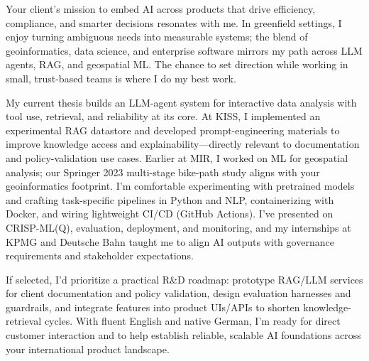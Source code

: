 Your client’s mission to embed AI across products that drive efficiency, compliance, and smarter decisions resonates with me. In greenfield settings, I enjoy turning ambiguous needs into measurable systems; the blend of geoinformatics, data science, and enterprise software mirrors my path across LLM agents, RAG, and geospatial ML. The chance to set direction while working in small, trust-based teams is where I do my best work.

My current thesis builds an LLM-agent system for interactive data analysis with tool use, retrieval, and reliability at its core. At KISS, I implemented an experimental RAG datastore and developed prompt-engineering materials to improve knowledge access and explainability—directly relevant to documentation and policy-validation use cases. Earlier at MIR, I worked on ML for geospatial analysis; our Springer 2023 multi-stage bike-path study aligns with your geoinformatics footprint. I’m comfortable experimenting with pretrained models and crafting task-specific pipelines in Python and NLP, containerizing with Docker, and wiring lightweight CI/CD (GitHub Actions). I’ve presented on CRISP-ML(Q), evaluation, deployment, and monitoring, and my internships at KPMG and Deutsche Bahn taught me to align AI outputs with governance requirements and stakeholder expectations.

If selected, I’d prioritize a practical R&D roadmap: prototype RAG/LLM services for client documentation and policy validation, design evaluation harnesses and guardrails, and integrate features into product UIs/APIs to shorten knowledge-retrieval cycles. With fluent English and native German, I’m ready for direct customer interaction and to help establish reliable, scalable AI foundations across your international product landscape.
